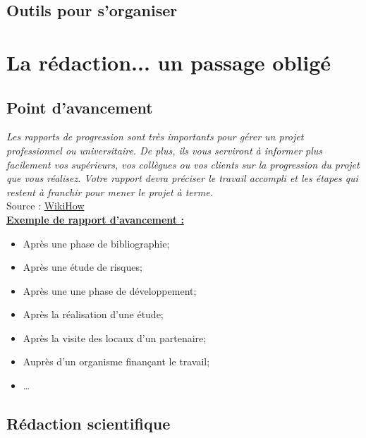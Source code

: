 \documentclass[a4paper,12pt]{report}
\begin{document}
\subsection{Outils pour s'organiser}






\FloatBarrier
\newpage
\section{La rédaction... un passage obligé}
\subsection{Point d'avancement}

\textit{Les rapports de progression sont très importants pour gérer un projet professionnel ou universitaire. De plus, ils vous serviront à informer plus facilement vos supérieurs, vos collègues ou vos clients sur la progression du projet que vous réalisez. Votre rapport devra préciser le travail accompli et les étapes qui restent à franchir pour mener le projet à terme.} \\

Source : \href{https://fr.wikihow.com/r\%C3\%A9diger-un-rapport-d\%27avancement}{WikiHow} \\

\underline{\textbf{Exemple de rapport d'avancement :}}\\
\begin{itemize}
\item Après une phase de bibliographie;
\item Après une étude de risques;
\item Après une une phase de développement;
\item Après la réalisation d'une étude;
\item Après la visite des locaux d'un partenaire;
\item Auprès d'un organisme finançant le travail;
\item \ldots
\end{itemize}



\FloatBarrier
\subsection{Rédaction scientifique}
\end{document}
